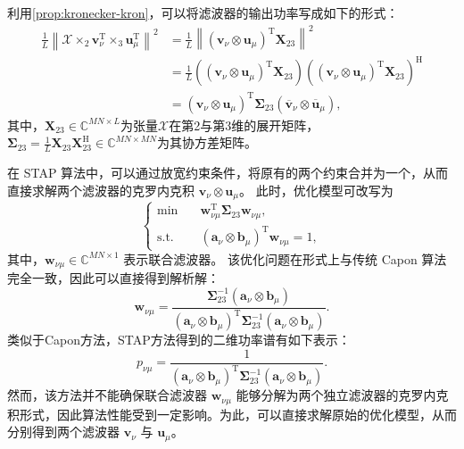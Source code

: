 利用\cref{prop:kronecker-kron}，可以将滤波器的输出功率写成如下的形式：
\[
    \begin{split}
        \frac{1}{L} \left\| \mathcal{X} \times_2 \bm{v}_{\nu}^{\mathrm{T}} \times_3 \bm{u}_{\mu}^{\mathrm{T}} \right\|^2
         & = \frac{1}{L} \left\| (\bm{v}_{\nu} \otimes \bm{u}_{\mu})^{\mathrm{T}} \mathbf{X}_{23}  \right\|^2                                                                           \\
         & = \frac{1}{L}  ((\bm{v}_{\nu} \otimes \bm{u}_{\mu})^{\mathrm{T}} \mathbf{X}_{23}) \left((\bm{v}_{\nu} \otimes \bm{u}_{\mu})^{\mathrm{T}} \mathbf{X}_{23}\right)^{\mathrm{H}} \\
         & = (\bm{v}_{\nu} \otimes \bm{u}_{\mu})^{\mathrm{T}} \mathbf{\Sigma}_{23} (\overline{\bm{v}}_{\nu} \otimes \overline{\bm{u}}_{\mu}),
    \end{split}
\]
其中，\( \mathbf{X}_{23} \in \mathbb{C}^{MN \times L} \)为张量\( \mathcal{X} \)在第2与第3维的展开矩阵，\( \mathbf{\Sigma}_{23} = \frac{1}{L} \mathbf{X}_{23} \mathbf{X}_{23}^{\mathrm{H}} \in \mathbb{C}^{MN \times MN} \)为其协方差矩阵。

在 STAP 算法中，可以通过放宽约束条件，将原有的两个约束合并为一个，从而直接求解两个滤波器的克罗内克积 \( \bm{v}_{\nu} \otimes \bm{u}_{\mu} \)。
此时，优化模型可改写为
\begin{equation}
    \begin{cases}
        \min \quad        & \bm{w}_{\nu\mu}^{\mathrm{T}} \mathbf{\Sigma}_{23} \bm{w}_{\nu\mu} ,    \\
        \text{s.t.} \quad & (\bm{a}_{\nu} \otimes \bm{b}_{\mu})^{\mathrm{T}} \bm{w}_{\nu\mu} = 1 ,
    \end{cases}
\end{equation}
其中，\( \bm{w}_{\nu\mu} \in \mathbb{C}^{MN \times 1} \) 表示联合滤波器。
该优化问题在形式上与传统 Capon 算法完全一致，因此可以直接得到解析解：
\begin{equation}
    \bm{w}_{\nu\mu}
    = \frac{\mathbf{\Sigma}_{23}^{-1} (\bm{a}_{\nu} \otimes \bm{b}_{\mu})}
    {(\bm{a}_{\nu} \otimes \bm{b}_{\mu})^{\mathrm{T}} \mathbf{\Sigma}_{23}^{-1} (\bm{a}_{\nu} \otimes \bm{b}_{\mu})}.
\end{equation}
类似于Capon方法，STAP方法得到的二维功率谱有如下表示：
\[
    p_{\nu\mu} =\frac{1}{(\bm{a}_{\nu} \otimes \bm{b}_{\mu})^{\mathrm{T}} \mathbf{\Sigma}_{23}^{-1} (\bm{a}_{\nu} \otimes \bm{b}_{\mu})}.
\]
然而，该方法并不能确保联合滤波器 \( \bm{w}_{\nu\mu} \) 能够分解为两个独立滤波器的克罗内克积形式，因此算法性能受到一定影响。为此，可以直接求解原始的优化模型，从而分别得到两个滤波器 \( \bm{v}_{\nu} \) 与 \( \bm{u}_{\mu} \)。

